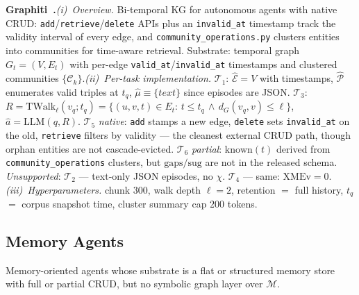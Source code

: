 \documentclass{article}
\begin{document}
\noindent\textbf{Graphiti~\citep{Graphiti}.}\quad\emph{(i)~Overview.} Bi-temporal KG for autonomous agents with native CRUD: \texttt{add}/\texttt{retrieve}/\texttt{delete} APIs plus an \texttt{invalid\_at} timestamp track the validity interval of every edge, and \texttt{community\_operations.py} clusters entities into communities for time-aware retrieval. Substrate: temporal graph $G_t\!=\!(V,E_t)$ with per-edge \texttt{valid\_at}/\texttt{invalid\_at} timestamps and clustered communities $\{\mathcal{C}_k\}$.\quad\emph{(ii)~Per-task implementation.} $\mathcal{T}_1$: $\hat{\mathcal{E}}\!=\!V$ with timestamps, $\hat{\mathcal{P}}$ enumerates valid triples at $t_q$, $\hat{\mu}\!\equiv\!\{\textit{text}\}$ since episodes are JSON. $\mathcal{T}_3$: $R\!=\!\mathrm{TWalk}_{\ell}(v_q;t_q)\!=\!\{(u,v,t)\!\in\!E_t\!:\,t\!\leq\!t_q\,\wedge\,d_G(v_q,v)\!\leq\!\ell\}$, $\hat{a}\!=\!\mathrm{LLM}(q,R)$. $\mathcal{T}_5$ \emph{native}: \texttt{add} stamps a new edge, \texttt{delete} sets \texttt{invalid\_at} on the old, \texttt{retrieve} filters by validity --- the cleanest external CRUD path, though orphan entities are not cascade-evicted. $\mathcal{T}_6$ \emph{partial}: $\mathrm{known}(t)$ derived from \texttt{community\_operations} clusters, but $\mathrm{gaps}/\mathrm{sug}$ are not in the released schema. \emph{Unsupported}: $\mathcal{T}_2$ — text-only JSON episodes, no $\chi$. $\mathcal{T}_4$ — same: $\mathrm{XMEv}\!=\!0$.\quad\emph{(iii)~Hyperparameters.} chunk $300$, walk depth $\ell\!=\!2$, retention $=$ full history, $t_q$ $=$ corpus snapshot time, cluster summary cap $200$ tokens.

\subsection{Memory Agents}\label{app:b-mem}

Memory-oriented agents whose substrate is a flat or structured memory store with full or partial CRUD, but no symbolic graph layer over $\mathcal{M}$.
\end{document}
